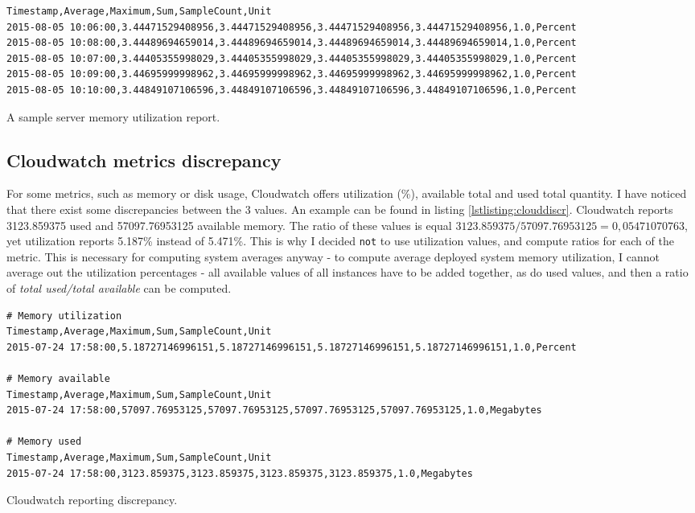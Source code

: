 \documentclass{uvamscse}
\begin{document}
\begin{sourcecode}[H]
\begin{lstlisting}[style=mono]
Timestamp,Average,Maximum,Sum,SampleCount,Unit
2015-08-05 10:06:00,3.44471529408956,3.44471529408956,3.44471529408956,3.44471529408956,1.0,Percent
2015-08-05 10:08:00,3.44489694659014,3.44489694659014,3.44489694659014,3.44489694659014,1.0,Percent
2015-08-05 10:07:00,3.44405355998029,3.44405355998029,3.44405355998029,3.44405355998029,1.0,Percent
2015-08-05 10:09:00,3.44695999998962,3.44695999998962,3.44695999998962,3.44695999998962,1.0,Percent
2015-08-05 10:10:00,3.44849107106596,3.44849107106596,3.44849107106596,3.44849107106596,1.0,Percent
\end{lstlisting}
\caption{A sample server memory utilization report.}
\label{lstlisting:memutilsrv}
\end{sourcecode}

\subsection{Cloudwatch metrics discrepancy}

For some metrics, such as memory or disk usage, Cloudwatch offers utilization (\%), available total and used total quantity. I have noticed that there exist some discrepancies between the 3 values. An example can be found in listing \ref{lstlisting:clouddiscr}. Cloudwatch reports 3123.859375 used and 57097.76953125 available memory. The ratio of these values is equal $3123.859375 / 57097.76953125 = 0,05471070763$, yet utilization reports 5.187\% instead of 5.471\%. This is why I decided \texttt{not} to use utilization values, and compute ratios for each of the metric. This is necessary for computing system averages anyway - to compute average deployed system memory utilization, I cannot average out the utilization percentages - all available values of all instances have to be added together, as do used values, and then a ratio of \textit{total used/total available} can be computed.

\begin{sourcecode}[H]
\begin{lstlisting}[style=mono]
# Memory utilization
Timestamp,Average,Maximum,Sum,SampleCount,Unit
2015-07-24 17:58:00,5.18727146996151,5.18727146996151,5.18727146996151,5.18727146996151,1.0,Percent

# Memory available
Timestamp,Average,Maximum,Sum,SampleCount,Unit
2015-07-24 17:58:00,57097.76953125,57097.76953125,57097.76953125,57097.76953125,1.0,Megabytes

# Memory used
Timestamp,Average,Maximum,Sum,SampleCount,Unit
2015-07-24 17:58:00,3123.859375,3123.859375,3123.859375,3123.859375,1.0,Megabytes
\end{lstlisting}
\caption{Cloudwatch reporting discrepancy.}
\label{lstlisting:clouddiscr}
\end{sourcecode}
\end{document}
